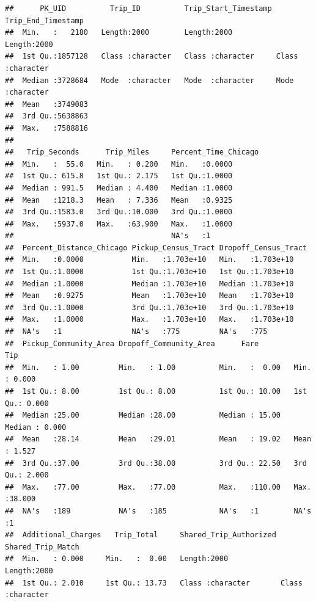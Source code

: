 \documentclass[
]{article}
\begin{document}
\begin{verbatim}
##      PK_UID          Trip_ID          Trip_Start_Timestamp Trip_End_Timestamp
##  Min.   :   2180   Length:2000        Length:2000          Length:2000       
##  1st Qu.:1857128   Class :character   Class :character     Class :character  
##  Median :3728684   Mode  :character   Mode  :character     Mode  :character  
##  Mean   :3749083                                                             
##  3rd Qu.:5638863                                                             
##  Max.   :7588816                                                             
##                                                                              
##   Trip_Seconds      Trip_Miles     Percent_Time_Chicago
##  Min.   :  55.0   Min.   : 0.200   Min.   :0.0000      
##  1st Qu.: 615.8   1st Qu.: 2.175   1st Qu.:1.0000      
##  Median : 991.5   Median : 4.400   Median :1.0000      
##  Mean   :1218.3   Mean   : 7.336   Mean   :0.9325      
##  3rd Qu.:1583.0   3rd Qu.:10.000   3rd Qu.:1.0000      
##  Max.   :5937.0   Max.   :63.900   Max.   :1.0000      
##                                    NA's   :1           
##  Percent_Distance_Chicago Pickup_Census_Tract Dropoff_Census_Tract
##  Min.   :0.0000           Min.   :1.703e+10   Min.   :1.703e+10   
##  1st Qu.:1.0000           1st Qu.:1.703e+10   1st Qu.:1.703e+10   
##  Median :1.0000           Median :1.703e+10   Median :1.703e+10   
##  Mean   :0.9275           Mean   :1.703e+10   Mean   :1.703e+10   
##  3rd Qu.:1.0000           3rd Qu.:1.703e+10   3rd Qu.:1.703e+10   
##  Max.   :1.0000           Max.   :1.703e+10   Max.   :1.703e+10   
##  NA's   :1                NA's   :775         NA's   :775         
##  Pickup_Community_Area Dropoff_Community_Area      Fare             Tip        
##  Min.   : 1.00         Min.   : 1.00          Min.   :  0.00   Min.   : 0.000  
##  1st Qu.: 8.00         1st Qu.: 8.00          1st Qu.: 10.00   1st Qu.: 0.000  
##  Median :25.00         Median :28.00          Median : 15.00   Median : 0.000  
##  Mean   :28.14         Mean   :29.01          Mean   : 19.02   Mean   : 1.527  
##  3rd Qu.:37.00         3rd Qu.:38.00          3rd Qu.: 22.50   3rd Qu.: 2.000  
##  Max.   :77.00         Max.   :77.00          Max.   :110.00   Max.   :38.000  
##  NA's   :189           NA's   :185            NA's   :1        NA's   :1       
##  Additional_Charges   Trip_Total     Shared_Trip_Authorized Shared_Trip_Match 
##  Min.   : 0.000     Min.   :  0.00   Length:2000            Length:2000       
##  1st Qu.: 2.010     1st Qu.: 13.73   Class :character       Class :character  

\end{verbatim}
\end{document}
